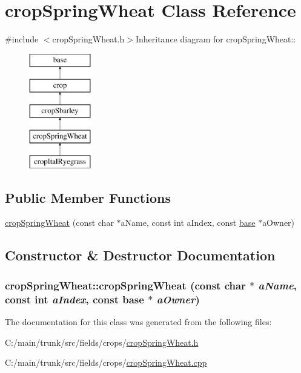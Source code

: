 \hypertarget{classcrop_spring_wheat}{
\section{cropSpringWheat Class Reference}
\label{classcrop_spring_wheat}
}


{\ttfamily \#include $<$cropSpringWheat.h$>$}Inheritance diagram for cropSpringWheat::\begin{figure}[H]
\begin{center}
\leavevmode
\includegraphics[height=5cm]{classcrop_spring_wheat}
\end{center}
\end{figure}
\subsection*{Public Member Functions}
\begin{DoxyCompactItemize}
\item 
\hyperlink{classcrop_spring_wheat_aac7e4a547bb65f690f1fcc0306855494}{cropSpringWheat} (const char $\ast$aName, const int aIndex, const \hyperlink{classbase}{base} $\ast$aOwner)
\end{DoxyCompactItemize}


\subsection{Constructor \& Destructor Documentation}
\hypertarget{classcrop_spring_wheat_aac7e4a547bb65f690f1fcc0306855494}{
\subsubsection[{cropSpringWheat}]{\setlength{\rightskip}{0pt plus 5cm}cropSpringWheat::cropSpringWheat (const char $\ast$ {\em aName}, \/  const int {\em aIndex}, \/  const {\bf base} $\ast$ {\em aOwner})}}
\label{classcrop_spring_wheat_aac7e4a547bb65f690f1fcc0306855494}


The documentation for this class was generated from the following files:\begin{DoxyCompactItemize}
\item 
C:/main/trunk/src/fields/crops/\hyperlink{crop_spring_wheat_8h}{cropSpringWheat.h}\item 
C:/main/trunk/src/fields/crops/\hyperlink{crop_spring_wheat_8cpp}{cropSpringWheat.cpp}\end{DoxyCompactItemize}

